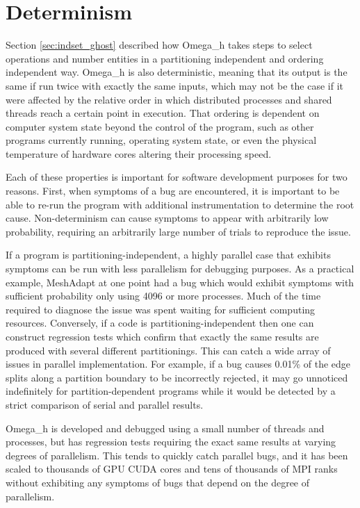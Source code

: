 \section{Determinism}
\label{sec:determinism}

Section \ref{sec:indset_ghost} described how Omega\_h takes steps
to select operations and number entities in a partitioning independent and
ordering independent way.
Omega\_h is also deterministic,
meaning that its output is the same if run twice with exactly
the same inputs, which may not be the case if it were affected
by the relative order in which distributed processes and shared
threads reach a certain point in execution.
That ordering is dependent
on computer system state beyond the control of the program,
such as other programs currently running, operating system
state, or even the physical temperature of hardware cores
altering their processing speed.

Each of these properties is important
for software development purposes for two reasons.
First, when symptoms of a bug are encountered,
it is important to be able to re-run the program with
additional instrumentation to determine the root cause.
Non-determinism can cause symptoms to appear with arbitrarily
low probability, requiring an arbitrarily large number of
trials to reproduce the issue.

If a program is partitioning-independent, a highly parallel
case that exhibits symptoms can be run with less parallelism
for debugging purposes.
As a practical example, MeshAdapt at one point had a bug
which would exhibit symptoms with sufficient probability
only using 4096 or more processes.
Much of the time required to diagnose the issue was spent
waiting for sufficient computing resources.
Conversely, if a code is partitioning-independent then
one can construct regression tests which confirm that
exactly the same results are produced with several different
partitionings.
This can catch a wide array of issues in parallel implementation.
For example, if a bug causes 0.01\% of the edge splits
along a partition boundary to be incorrectly rejected,
it may go unnoticed indefinitely for partition-dependent programs
while it would be detected by a strict comparison
of serial and parallel results.

Omega\_h is developed and debugged using a small number
of threads and processes, but has regression tests requiring
the exact same results at varying degrees of parallelism.
This tends to quickly catch parallel bugs, and it has
been scaled to thousands of GPU CUDA cores and tens of
thousands of MPI ranks without exhibiting any symptoms of
bugs that depend on the degree of parallelism.


